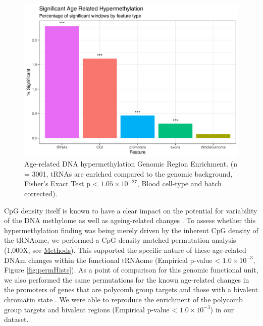 \documentclass[]{book}
\begin{document}
\begin{figure}

{\centering \includegraphics[width=0.9\linewidth]{./figs/nSigWinProps_WGfishers_BB_sws_hyper_2_BL_noPolyBivExcl_BarTxtast_sr} 

}

\caption{Age-related DNA hypermethylation Genomic Region Enrichment. (n = 3001, tRNAs are enriched compared to the genomic background, Fisher's Exact Test p \textless{} \(1.05\times10^{-27}\), Blood cell-type and batch corrected).}\label{fig:sizePropEnrich}
\end{figure}



CpG density itself is known to have a clear impact on the potential for variability of the DNA methylome as well as ageing-related changes \citep{Ziller2013, Christensen2009}.
To assess whether this hypermethylation finding was being merely driven by the inherent CpG density of the tRNAome, we performed a CpG density matched permutation analysis (1,000X, see \protect\hyperlink{AgeErichmentPermutation}{Methods}).
This supported the specific nature of these age-related DNAm changes within the functional tRNAome (Empirical p-value \textless{} \(1.0\times10^{-3}\), Figure \ref{fig:permHists}).
As a point of comparison for this genomic functional unit, we also performed the same permutations for the known age-related changes in the promoters of genes that are polycomb group targets \citep{Teschendorff2010} and those with a bivalent chromatin state \citep{Rakyan2010}.
We were able to reproduce the enrichment of the polycomb group targets and bivalent regions (Empirical p-value \textless{} \(1.0\times10^{-3}\)) in our dataset.
\end{document}
